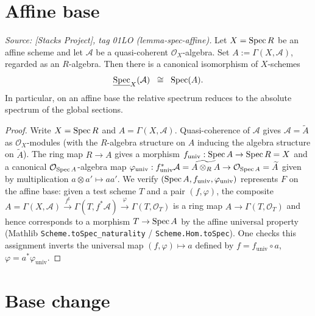 \section{Affine base}
\label{sec:relspec_affine}

\begin{theorem}
  \label{thm:relative_spec_affine_base}
  \textit{Source: [Stacks Project], tag 01LO (lemma-spec-affine).}
  Let \(X = \operatorname{Spec} R\) be an affine scheme and let \(\mathcal{A}\) be a quasi-coherent
  \(\mathcal{O}_X\)-algebra. Set \(A := \Gamma(X, \mathcal{A})\), regarded as an
  \(R\)-algebra. Then there is a canonical isomorphism of \(X\)-schemes
  \[
    \underline{\operatorname{Spec}}_X(\mathcal{A}) \;\;\cong\;\; \operatorname{Spec}(A).
  \]
  In particular, on an affine base the relative spectrum reduces to the absolute
  spectrum of the global sections.
\end{theorem}

\begin{proof}
  Write \(X = \operatorname{Spec} R\) and \(A = \Gamma(X, \mathcal{A})\). Quasi-coherence of
  \(\mathcal{A}\) gives \(\mathcal{A} = \widetilde{A}\) as \(\mathcal{O}_X\)-modules
  (with the \(R\)-algebra structure on \(A\) inducing the algebra structure on
  \(\widetilde A\)). The ring map \(R \to A\) gives a morphism
  \(f_{\mathrm{univ}} : \operatorname{Spec} A \to \operatorname{Spec} R = X\) and a canonical
  \(\mathcal{O}_{\operatorname{Spec} A}\)-algebra map
  $\varphi_{\mathrm{univ}} : f_{\mathrm{univ}}^* \mathcal{A} = \widetilde{A \otimes_R A}
  \to \mathcal{O}_{\operatorname{Spec} A} = \widetilde A$ given by multiplication
  \(a \otimes a' \mapsto aa'\). We verify \((\operatorname{Spec} A, f_{\mathrm{univ}}, \varphi_{\mathrm{univ}})\)
  represents \(F\) on the affine base: given a test scheme \(T\) and a pair
  \((f, \varphi)\), the composite
  $A = \Gamma(X, \mathcal{A}) \xrightarrow{f^\sharp}
  \Gamma(T, f^*\mathcal{A}) \xrightarrow{\varphi} \Gamma(T, \mathcal{O}_T)$
  is a ring map \(A \to \Gamma(T, \mathcal{O}_T)\) and hence corresponds to a morphism
  \(T \to \operatorname{Spec} A\) by the affine universal property
  (Mathlib \texttt{Scheme.toSpec\_naturality} /
  \texttt{Scheme.Hom.toSpec}). One checks this assignment inverts the universal map
  \((f, \varphi) \mapsto a\) defined by \(f = f_{\mathrm{univ}} \circ a\),
  \(\varphi = a^* \varphi_{\mathrm{univ}}\).
\end{proof}

\section{Base change}
\label{sec:relspec_basechange}

